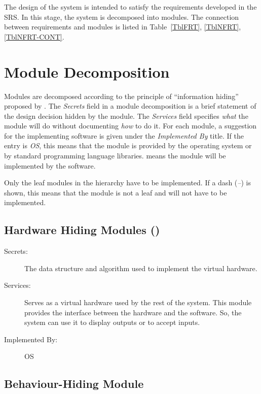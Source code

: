 \documentclass[12pt, titlepage]{article}
\begin{document}
  The design of the system is intended to satisfy the requirements developed in
  the SRS. In this stage, the system is decomposed into modules. The connection
  between requirements and modules is listed in Table~\ref{TblFRT}, \ref{TblNFRT}, \ref{TblNFRT-CONT}.
  
  \section{Module Decomposition} \label{SecMD}
  
  Modules are decomposed according to the principle of ``information hiding''
  proposed by \citet{ParnasEtAl1984}. The \emph{Secrets} field in a module
  decomposition is a brief statement of the design decision hidden by the
  module. The \emph{Services} field specifies \emph{what} the module will do
  without documenting \emph{how} to do it. For each module, a suggestion for the
  implementing software is given under the \emph{Implemented By} title. If the
  entry is \emph{OS}, this means that the module is provided by the operating
  system or by standard programming language libraries.  \emph{\progname{}} means the
  module will be implemented by the \progname{} software.
  
  Only the leaf modules in the hierarchy have to be implemented. If a dash
  (\emph{--}) is shown, this means that the module is not a leaf and will not have
  to be implemented.
  
  \subsection{Hardware Hiding Modules (\label{mHH})}
  
  \begin{description}
  \item[Secrets:]The data structure and algorithm used to implement the virtual
    hardware.
  \item[Services:]Serves as a virtual hardware used by the rest of the
    system. This module provides the interface between the hardware and the
    software. So, the system can use it to display outputs or to accept inputs.
  \item[Implemented By:] OS
  \end{description}
  
  \subsection{Behaviour-Hiding Module}
\end{document}
